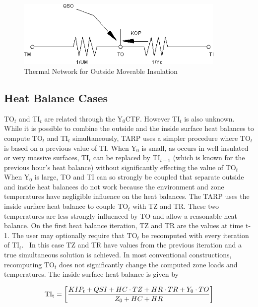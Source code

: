\begin{figure}[hbtp] %
\centering
\includegraphics[width=0.9\textwidth, height=0.9\textheight, keepaspectratio=true]{media/image422.png}
\caption{Thermal Network for Outside Moveable Insulation \protect \label{fig:thermal-network-for-outside-moveable}}
\end{figure}

\subsection{Heat Balance Cases}\label{heat-balance-cases}

TO\(_{t}\) and TI\(_{t}\) are related through the Y\(_{0}\)CTF. However TI\(_{t}\) is also unknown. While it is possible to combine the outside and the inside surface heat balances to compute TO\(_{t}\) and TI\(_{t}\) simultaneously, TARP uses a simpler procedure where TO\(_{t}\) is based on a previous value of TI. When Y\(_{0}\) is small, as occurs in well insulated or very massive surfaces, TI\(_{t}\) can be replaced by TI\(_{t-1}\) (which is known for the previous hour's heat balance) without significantly effecting the value of TO\(_{t}\) When Y\(_{0}\) is large, TO and TI can so strongly be coupled that separate outside and inside heat balances do not work because the environment and zone temperatures have negligible influence on the heat balances. The TARP uses the inside surface heat balance to couple TO\(_{t}\) with TZ and TR. These two temperatures are less strongly influenced by TO and allow a reasonable heat balance. On the first heat balance iteration, TZ and TR are the values at time t-1. The user may optionally require that TO\(_{t}\) be recomputed with every iteration of TI\(_{t}\). ~In this case TZ and TR have values from the previous iteration and a true simultaneous solution is achieved. In most conventional constructions, recomputing TO\(_{t}\) does not significantly change the computed zone loads and temperatures. The inside surface heat balance is given by

\begin{equation}
{\rm{T}}{{\rm{I}}_{\rm{t}}} = \left[ {\frac{{KI{P_t} + QSI + HC\cdot TZ + HR\cdot TR + {Y_0}\cdot TO}}{{{Z_0} + HC + HR}}} \right]
\end{equation}

